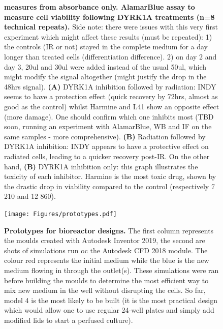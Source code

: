 \documentclass[onecolumn,10pt]{asme2ej}
\begin{document}
\begin{figure}[h]
	\caption{\textbf{measures from absorbance only.
			AlamarBlue assay to measure cell viability following DYRK1A treatments (n=8 technical repeats).}
		Side note: there were issues with this very first experiment which might affect these results (must be repeated):
		1) the controls (IR or not) stayed in the complete medium for a day longer than treated cells (differentiation difference). 
		2) on day 2 and day 3, 20ul and 30ul were added instead of the usual 50ul, which might modify the signal altogether (might justify the drop in the 48hrs signal).
		\textbf{(A)} DYRK1A inhibition followed by radiation: INDY seems to have a protection effect (quick recovery by 72hrs, almost as good as the control) whilst Harmine and L41 show an opposite effect (more damage). One should confirm which one inhibits most (TBD soon, running an experiment with AlamarBlue, WB and IF on the same samples - more comprehensive). 	
		\textbf{(B)} Radiation followed by DYRK1A inhibition: INDY appears to have a protective effect on radiated cells, leading to a quicker recovery post-IR. On the other hand,  
		\textbf{(B)} DYRK1A inhibition only: this graph illustrates the toxicity of each inhibitor. Harmine is the most toxic drug, shown by the drastic drop in viability compared to the control (respectively 7 210 and 12 860).
	}
	\label{AlamarBlue}
\end{figure}
\newpage







\begin{figure}[h]
	\texttt{[image: Figures/prototypes.pdf]}
	\caption{\textbf{Prototypes for bioreactor designs.} The first column represents the moulds created with Autodesk Inventor 2019, the second are shots of simulations run oc the Autodesk CFD 2018 module. The colour red represents the initial medium while the blue is the new medium flowing in through the outlet(s). These simulations were ran before building the moulds to determine the most efficient way to mix new medium in the well without disrupting the cells. So far, model 4 is the most likely to be built (it is the most practical design which would allow one to use regular 24-well plates and simply add modified lids to start a perfused culture).}
	\label{simulations}
\end{figure}
\end{document}
